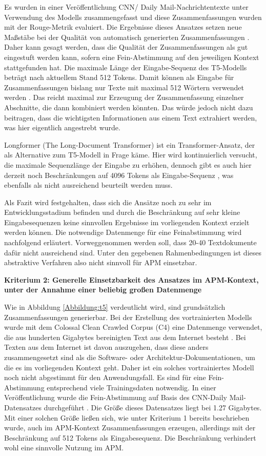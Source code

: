 Es wurden in einer Veröffentlichung CNN/ Daily Mail-Nachrichtentexte unter Verwendung des Modells zusammengefasst und diese Zusammenfassungen wurden mit der Rouge-Metrik evaluiert. Die Ergebnisse dieses Ansatzes setzen neue Maßstäbe bei der Qualität von automatisch generierten Zusammenfassungen \cite[S. 39]{Raffel}. Daher kann gesagt werden, dass die Qualität der Zusammenfassungen als gut eingestuft werden kann, sofern eine Fein-Abstimmung auf den jeweiligen Kontext stattgefunden hat. Die maximale Länge der Eingabe-Sequenz des T5-Modells beträgt nach aktuellem Stand 512 Tokens. Damit können als Eingabe für Zusammenfassungen bislang nur Texte mit maximal 512 Wörtern verwendet werden \cite[S. 39]{Raffel}. Das reicht maximal zur Erzeugung der Zusammenfassung einzelner Abschnitte, die dann kombiniert werden könnten. Das würde jedoch nicht dazu beitragen, dass die wichtigsten Informationen aus einem Text extrahiert werden, was hier eigentlich angestrebt wurde.

Longformer (The Long-Document Transformer) ist ein Transformer-Ansatz, der als Alternative zum T5-Modell in Frage käme. Hier wird kontinuierlich versucht, die maximale Sequenzlänge der Eingabe zu erhöhen, dennoch gibt es auch hier derzeit noch Beschränkungen auf 4096 Tokens als Eingabe-Sequenz \cite{Longformer} \cite{Longformer2}, was ebenfalls als nicht ausreichend beurteilt werden muss.

Als Fazit wird festgehalten, dass sich die Ansätze noch zu sehr im Entwicklungsstadium befinden und durch die Beschränkung auf sehr kleine Eingabesequenzen keine sinnvollen Ergebnisse im vorliegenden Kontext erzielt werden können. Die notwendige Datenmenge für eine Feinabstimmung wird nachfolgend erläutert. Vorweggenommen werden soll, dass 20-40 Textdokumente dafür nicht ausreichend sind. Unter den gegebenen Rahmenbedingungen ist dieses abstraktive Verfahren also nicht sinnvoll für APM einsetzbar.

{\bf Kriterium 2: Generelle Einsetzbarkeit des Ansatzes im APM-Kontext, unter der Annahme einer beliebig großen Datenmenge}

Wie in Abbildung \ref{Abbildung:t5} verdeutlicht wird, sind grundsätzlich Zusammenfassungen generierbar. Bei der Erstellung des vortrainierten Modells wurde mit dem Colossal Clean Crawled Corpus (C4) eine Datenmenge verwendet, die aus hunderten Gigabytes bereinigten Text aus dem Internet besteht \cite[S. 5-7]{Raffel}. Bei Texten aus dem Internet ist davon auszugehen, dass diese anders zusammengesetzt sind als die Software- oder Architektur-Dokumentationen, um die es im vorliegenden Kontext geht. Daher ist ein solches vortrainiertes Modell noch nicht abgestimmt für den Anwendungsfall. Es sind für eine Fein-Abstimmung entsprechend viele Trainingsdaten notwendig. In einer Veröffentlichung wurde die Fein-Abstimmung auf Basis des CNN-Daily Mail-Datensatzes durchgeführt \cite[S. 37]{Raffel}. Die Größe dieses Datensatzes liegt bei 1.27 Gigabytes. Mit einer solchen Größe ließen sich, wie unter Kriterium 1 bereits beschrieben wurde, auch im APM-Kontext Zusammenfassungen erzeugen, allerdings mit der Beschränkung auf 512 Tokens als Eingabesequenz. Die Beschränkung verhindert wohl eine sinnvolle Nutzung im APM.

